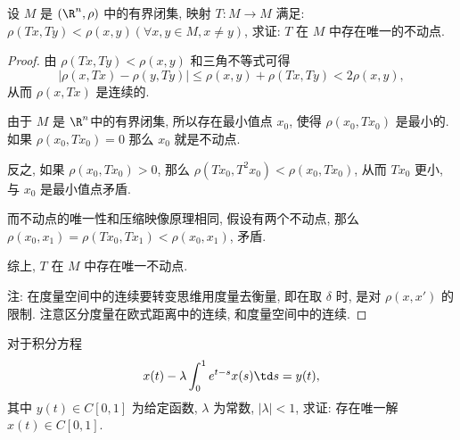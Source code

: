 \problem[1.1.6] 设 $M$ 是 $(\R^n,\rho)$ 中的有界闭集, 映射 $T:M\to M$ 满足: $\rho(Tx,Ty)<\rho(x,y)(\forall x,y\in M,x\neq y)$, 求证: $T$ 在 $M$ 中存在唯一的不动点.

\begin{proof}
	由 $\rho(Tx,Ty)<\rho(x,y)$ 和三角不等式可得 $$|\rho(x,Tx)-\rho(y,Ty)|\leqslant \rho(x,y)+\rho(Tx,Ty)<2\rho(x,y),$$ 从而 $\rho(x,Tx)$ 是连续的.

	由于 $M$ 是 $\R^n$中的有界闭集, 所以存在最小值点 $x_0$, 使得 $\rho(x_0,Tx_0)$ 是最小的. 如果 $\rho(x_0,Tx_0)=0$ 那么 $x_0$ 就是不动点.

	反之, 如果 $\rho(x_0,Tx_0)>0$, 那么 $\rho(Tx_0,T^2x_0)<\rho(x_0,Tx_0)$, 从而 $Tx_0$ 更小, 与 $x_0$ 是最小值点矛盾.

	而不动点的唯一性和压缩映像原理相同, 假设有两个不动点, 那么 $\rho(x_0,x_1)=\rho(Tx_0,Tx_1)<\rho(x_0,x_1)$, 矛盾.

	综上, $T$ 在 $M$ 中存在唯一不动点.

	注: 在度量空间中的连续要转变思维用度量去衡量, 即在取 $\delta$ 时, 是对 $\rho(x,x')$ 的限制. 注意区分度量在欧式距离中的连续, 和度量空间中的连续.
\end{proof}

\problem[1.1.7]  对于积分方程 $$x(t)-\lambda\int_0^1 e^{t-s}x(s)\td s=y(t),$$ 其中 $y(t)\in C[0,1]$ 为给定函数, $\lambda$ 为常数, $|\lambda|<1$, 求证: 存在唯一解 $x(t)\in C[0,1]$.


